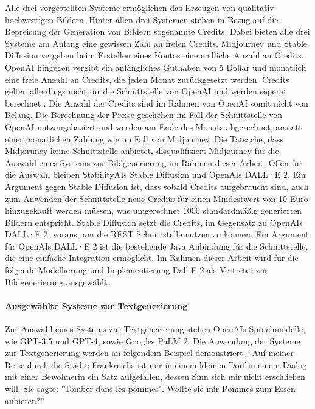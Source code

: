 Alle drei vorgestellten Systeme ermöglichen das Erzeugen von qualitativ hochwertigen Bildern.
Hinter allen drei Systemen stehen in Bezug auf die Bepreisung der Generation von Bildern sogenannte Credits.
Dabei bieten alle drei Systeme am Anfang eine gewissen Zahl an freien Credits.
Midjourney und Stable Diffusion vergeben beim Erstellen eines Kontos eine endliche Anzahl an Credits.
OpenAI hingegen vergibt ein anfängliches Guthaben von 5 Dollar und monatlich eine freie Anzahl an Credits, die jeden Monat zurückgesetzt werden.
Credits gelten allerdings nicht für die Schnittstelle von OpenAI und werden seperat berechnet \cite{openai-dall-e-seperate-billing}.
Die Anzahl der Credits sind im Rahmen von OpenAI somit nicht von Belang.
Die Berechnung der Preise geschehen im Fall der Schnittstelle von OpenAI nutzungsbasiert und werden am Ende des Monats abgerechnet, anstatt einer monatlichen Zahlung wie im Fall von Midjourney.
Die Tatsache, dass Midjoruney keine Schnittstelle anbietet, disqualifiziert Midjourney für die Auswahl eines Systems zur Bildgenerierung im Rahmen dieser Arbeit.
Offen für die Auswahl bleiben StabilityAIs Stable Diffusion und OpenAIs DALL·E 2.
Ein Argument gegen Stable Diffusion ist, dass sobald Credits aufgebraucht sind, auch zum Anwenden der Schnittstelle neue Credits für einen Mindestwert von 10 Euro hinzugekauft werden müssen, was umgerechnet 1000 standardmäßig generierten Bildern entspricht.
Stable Diffusion setzt die Credits, im Gegensatz zu OpenAIs DALL·E 2, voraus, um die REST Schnittstelle nutzen zu können.
Ein Argument für OpenAIs DALL·E 2 ist die bestehende Java Anbindung für die Schnittstelle, die eine einfache Integration ermöglicht.
Im Rahmen dieser Arbeit wird für die folgende Modellierung und Implementierung Dall-E 2 als Vertreter zur Bildgenerierung ausgewählt.

\paragraph{Ausgewählte Systeme zur Textgenerierung}
Zur Auswahl eines Systems zur Textgenerierung stehen OpenAIs Sprachmodelle, wie GPT-3.5 und GPT-4, sowie Googles PaLM 2.
Die Anwendung der Systeme zur Textgenerierung werden an folgendem Beispiel demonstriert: \enquote{Auf meiner Reise durch die Städte Frankreichs ist mir in einem kleinen Dorf in einem Dialog mit einer Bewohnerin ein Satz aufgefallen, dessen Sinn sich mir nicht erschließen will. Sie sagte: "Tomber dans les pommes". Wollte sie mir Pommes zum Essen anbieten?}

